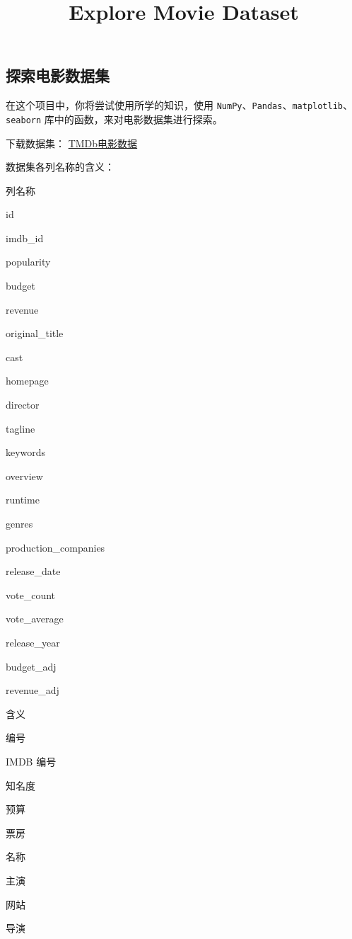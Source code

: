 \documentclass[11pt]{article}
\title{Explore Movie Dataset}
\begin{document}
    
    
    \maketitle
    
    

    
    \subsection{探索电影数据集}\label{ux63a2ux7d22ux7535ux5f71ux6570ux636eux96c6}

在这个项目中，你将尝试使用所学的知识，使用
\texttt{NumPy}、\texttt{Pandas}、\texttt{matplotlib}、\texttt{seaborn}
库中的函数，来对电影数据集进行探索。

下载数据集：
\href{https://s3.cn-north-1.amazonaws.com.cn/static-documents/nd101/explore+dataset/tmdb-movies.csv}{TMDb电影数据}

    数据集各列名称的含义：

列名称

id

imdb\_id

popularity

budget

revenue

original\_title

cast

homepage

director

tagline

keywords

overview

runtime

genres

production\_companies

release\_date

vote\_count

vote\_average

release\_year

budget\_adj

revenue\_adj

含义

编号

IMDB 编号

知名度

预算

票房

名称

主演

网站

导演
\end{document}
